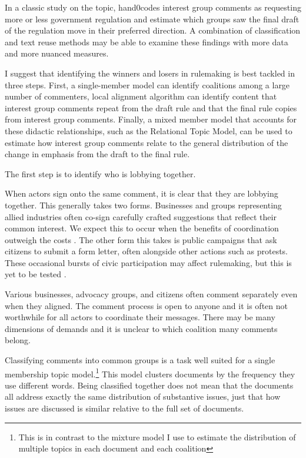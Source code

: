 \documentclass{article}
\begin{document}
In a classic study on the topic, \citet{Yackee2006} hand0codes interest group comments as requesting more or less government regulation and estimate which groups saw the final draft of the regulation move in their preferred direction. A combination of classification and text reuse methods may be able to examine these findings with more data and more nuanced measures.

I suggest that identifying the winners and losers in rulemaking is best tackled in three steps. First, a single-member model can identify coalitions among a large number of commenters, local alignment algorithm can identify content that interest group comments repeat from the draft rule and that the final rule copies from interest group comments. Finally, a mixed member model that accounts for these didactic relationships, such as the Relational Topic Model, can be used to estimate how interest group comments relate to the general distribution of the change in emphasis from the draft to the final rule.

The first step is to identify who is lobbying together. 

When actors sign onto the same comment, it is clear that they are lobbying together. This generally takes two forms. Businesses and groups representing allied industries often co-sign carefully crafted suggestions that reflect their common interest. We expect this to occur when the benefits of coordination outweigh the costs \citep{Yackee2009}. The other form this takes is public campaigns that ask citizens to submit a form letter, often alongside other actions such as protests. These occasional bursts of civic participation may affect rulemaking, but this is yet to be tested  \citep{Coglianese2001SocialMovement}.%

Various businesses, advocacy groups, and citizens often comment separately even when they aligned. The comment process is open to anyone and it is often not worthwhile for all actors to coordinate their messages. There may be many dimensions of demands and it is unclear to which coalition many comments belong.

Classifying comments into common groups is a task well suited for a single membership topic model.\footnote{This is in contrast to the mixture model I use to estimate the distribution of multiple topics in each document and each coalition} This model clusters documents by the frequency they use different words. Being classified together does not mean that the documents all address exactly the same distribution of substantive issues, just that how issues are discussed is similar relative to the full set of documents.
\end{document}
